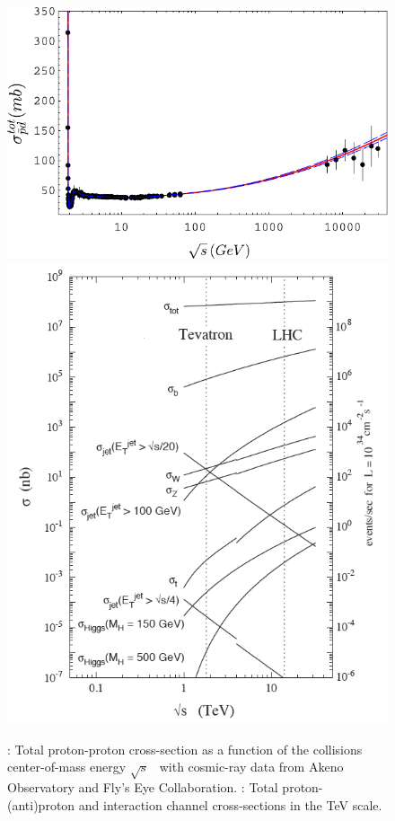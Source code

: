 	\begin{figure}
		\vspace{15pt}
		\begin{minipage}{\linewidth}
			\centering\captionsetup[subfigure]{justification=centering}
			\includegraphics[width=\linewidth]{fig/chapt2/pp-total-cross-section.pdf}
			\subcaption{\label{fig:pp-cross-section:A}}
			\includegraphics[width=\linewidth]{fig/chapt2/Cross-sections.png}
			\subcaption{\label{fig:pp-cross-section:B}}
		\end{minipage}
		\caption{\label{fig:pp-cross-section} : Total proton-proton cross-section as a function of the collisions center-of-mass energy $\sqrt{s}$~\cite{ARKHIPOV2001} with cosmic-ray data from Akeno Observatory and Fly’s Eye Collaboration. : Total proton-(anti)proton and interaction channel cross-sections in the \si{TeV} scale.}
	\end{figure}
	
